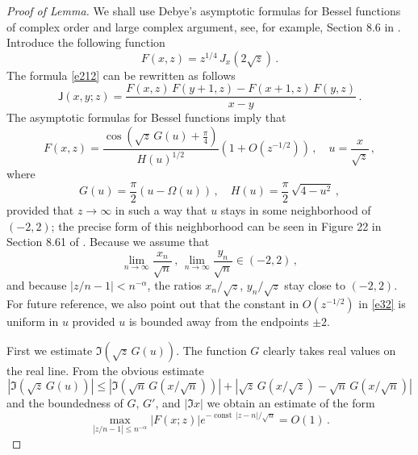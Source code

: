 \documentclass[12pt]{amsart}
\newcommand{\al}{\alpha}
\newcommand{\J}{\mathsf{J}}
\newcommand{\const}{\operatorname{const}}
\theoremstyle{plain}
\theoremstyle{definition}
\numberwithin{equation}{section}
\begin{document}
\begin{proof}[Proof of Lemma]
We shall use Debye's asymptotic formulas for  Bessel functions of complex
order and large complex argument, see, for example,  Section 8.6 in \cite{W}.
Introduce the following function
%
\begin{equation*}
F(x,z)=z^{1/4} \, J_x(2\sqrt{z}) \,.
\end{equation*}
%
The formula \eqref{e212} can be rewritten as follows 
\begin{equation}\label{e31}
\J(x,y;z)=\frac{F(x,z)\, F(y+1,z) - F(x+1,z) \,F(y,z)}{x-y} \,. 
\end{equation}
%
The asymptotic formulas for Bessel functions imply that 
%
\begin{equation}\label{e32}
F(x,z)=\frac{\cos
\left(\sqrt{z} \, G(u) +\frac{\pi}4\right)}{H(u)^{1/2}}
\left(1+O\left(z^{-1/2}\right)\right) \,, \quad u=\frac{x}{\sqrt{z}} \,,
\end{equation}
%
where
%
\begin{equation*}
G(u)=\frac{\pi}{2}\left(u-\Omega(u)\right)\,,
\quad H(u)=\frac{\pi}2 \, \sqrt{4-u^2} \,,
\end{equation*}
%
provided that  $z\to\infty$ in such a way that $u$ stays in some neighborhood
of $(-2,2)$; the precise form of this neighborhood can be seen in Figure 22
in Section 8.61 of \cite{W}.  Because we assume that 
%
\begin{equation*}
\lim_{n\to\infty} \frac{x_n}{\sqrt{n}}\,,\,\lim_{n\to\infty} \frac{y_n}{\sqrt{n}} \in (-2,2) \,,
\end{equation*}
%
and because $|z/n-1|<n^{-\al}$, 
 the ratios ${x_n}/{\sqrt{z}}$, ${y_n}/{\sqrt{z}}$ stay 
close to $(-2,2)$. For future reference, we also point
out that the constant in $O\left(z^{-1/2}\right)$ in \eqref{e32} is uniform in 
$u$ provided  $u$ is bounded away from the endpoints $\pm2$. 

First  we estimate $\Im \left(\sqrt{z} \, G(u)\right) $. The function
$G$ clearly takes real values on the real line. From the obvious 
estimate 
%
\begin{equation*}
\left| \Im \left(\sqrt{z} \, G(u) \right) \right|
\le
\left| \Im \left(\sqrt{n} \, G(x/\sqrt{n}) \right) \right|
+ \left| \sqrt{z}  \, G(x/\sqrt{z}) -
\sqrt{n}  \, G(x/\sqrt{n}) \right| 
\end{equation*}
%
and the boundedness of  $G$, $G'$, and  $|\Im x|$ we obtain an estimate of the form  
%
\begin{equation}\label{e33}
\max_{|z/n-1|\le n^{-\al}} |F(x;z)| e^{-\const\, |z-n|/\sqrt{n}}  
= O(1)\,. 
\end{equation}
%


\end{proof}
\end{document}
